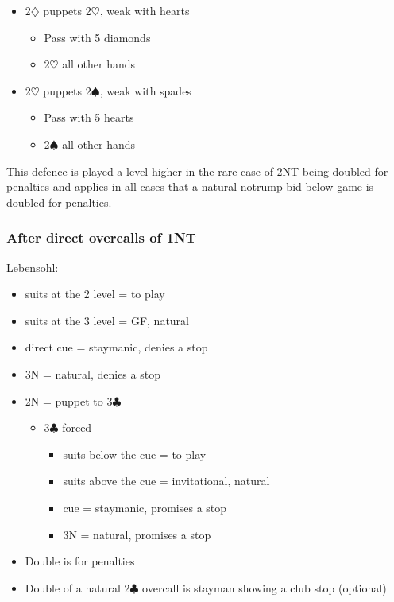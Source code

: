 \documentclass[a4paper,14pt]{extarticle}
\begin{document}
\begin{itemize}
\begin{itemize}
	\end{itemize}
\item 2$\diamondsuit$ puppets 2$\heartsuit$, weak with hearts
	\begin{itemize}
	\item Pass with 5 diamonds
	\item 2$\heartsuit$ all other hands
	\end{itemize}
\item 2$\heartsuit$ puppets 2$\spadesuit$, weak with spades
	\begin{itemize}
	\item Pass with 5 hearts
	\item 2$\spadesuit$ all other hands
	\end{itemize}
\end{itemize}

This defence is played a level higher in the rare case of 2NT being doubled for
penalties and applies in all cases that a natural notrump bid below game is doubled for
penalties.

\subsubsection{After direct overcalls of 1NT}
\label{sec:resp:lebensohl}

Lebensohl:

\begin{itemize}
\item suits at the 2 level = to play
\item suits at the 3 level = GF, natural
\item direct cue = staymanic, denies a stop
\item 3N = natural, denies a stop
\item 2N = puppet to 3$\clubsuit$
	\begin{itemize}
	\item 3$\clubsuit$ forced
		\begin{itemize}
		\item suits below the cue = to play
		\item suits above the cue = invitational, natural
		\item cue = staymanic, promises a stop
		\item 3N = natural, promises a stop
		\end{itemize}
	\end{itemize}
\item Double is for penalties
\item Double of a natural 2$\clubsuit$ overcall is stayman showing a club stop (optional)
\end{itemize}
\end{document}
